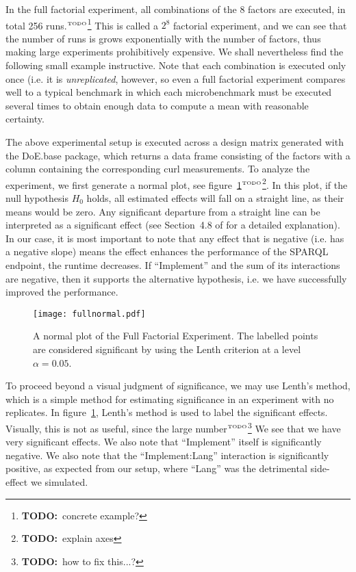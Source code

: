 \documentclass{llncs}
\newcommand{\todo}[1]{\ensuremath{^{\textrm{\tiny{TODO}\normalsize}}}\footnote{\textbf{TODO:}~#1}}
\begin{document}
In the full factorial experiment, all combinations of the 8 factors
are executed, in total 256 runs.\todo{concrete example?} This is
called a $2^8$ factorial experiment, and we can see that the number of
runs is grows exponentially with the number of factors, thus making
large experiments prohibitively expensive. We shall nevertheless find
the following small example instructive. Note that each combination is
executed only once (i.e. it is \emph{unreplicated}, however, so even a
full factorial experiment compares well to a typical benchmark in
which each microbenchmark must be executed several times to obtain
enough data to compute a mean with reasonable certainty.

The above experimental setup is executed across a design matrix
generated with the DoE.base package, which returns a data frame
consisting of the factors with a column containing the corresponding
curl measurements. To analyze the experiment, we first generate a
normal plot, see figure~\ref{fig:fullnormal}\todo{explain axes}. In this plot, if the
null hypothesis $H_0$ holds, all estimated effects will fall on a
straight line, as their means would be zero. Any significant departure
from a straight line can be interpreted as a significant effect (see
Section~4.8 of \cite{wu2009experiments} for a detailed
explanation). In our case, it is most important to note that any
effect that is negative (i.e. has a negative slope) means the effect
enhances the performance of the SPARQL endpoint, the runtime
decreases. If ``Implement'' and the sum of its interactions are
negative, then it supports the alternative hypothesis, i.e. we have
successfully improved the performance.

\begin{figure}[h]
  \texttt{[image: fullnormal.pdf]}
  \caption{A normal plot of the Full Factorial Experiment. The
    labelled points are considered significant by using the Lenth
    criterion at a level $\alpha=0.05$.}\label{fig:fullnormal}
\end{figure}


To proceed beyond a visual judgment of significance, we may use
Lenth's method\cite{lenthmethod}, which is a simple method for
estimating significance in an experiment with no replicates. In
figure~\ref{fig:fullnormal}, Lenth's method is used to label the
significant effects. Visually, this is not as useful, since the large
number\todo{how to fix this...?} We see that we have very significant
effects. We also note that ``Implement'' itself is significantly
negative. We also note that the ``Implement:Lang'' interaction is
significantly positive, as expected from our setup, where ``Lang'' was
the detrimental side-effect we simulated.
\end{document}
